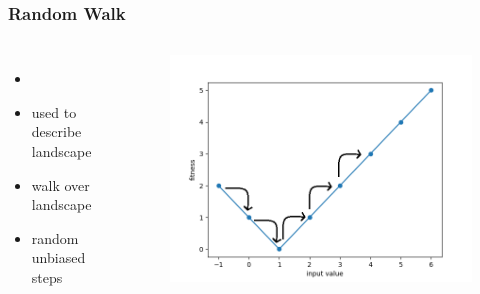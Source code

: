 \begin{frame}
	\frametitle{Random Walk}
	
	\begin{columns}[c]
		

		\begin{itemize}
			\item \cite{Kauffman.1987}
			\item used to describe landscape
			\item walk over landscape
			\item random unbiased steps
		\end{itemize}
		
		\begin{figure}
			\includegraphics[width=1\textwidth]{figures/random_walk}
		\end{figure}

	\end{columns}
	
\end{frame}

